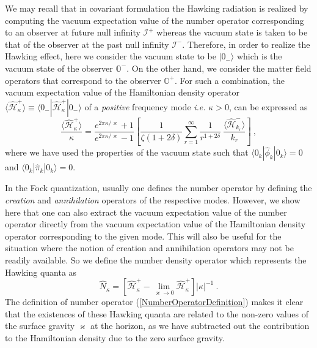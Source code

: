 \documentclass[aps,twocolumn,showpacs]{revtex4}
\def\kr{\kappa}
\def\ksg{\mathrm{\varkappa}}
\def\scriplus{\mathscr{I}^{+}}
\def\scriminus{\mathscr{I}^{-}}
\def\observerminus{\mathbb{O}^{-}}
\def\observerplus{\mathbb{O}^{+}}
\begin{document}
We may recall that in covariant formulation the Hawking radiation is realized 
by computing the vacuum expectation value of the number operator corresponding 
to an observer at future null infinity $\scriplus$ whereas the vacuum state is 
taken to be that of the observer at the past null infinity $\scriminus$. 
Therefore, in order to realize the Hawking effect, here we consider the vacuum 
state to be $|0_{-}\rangle$ which is the vacuum state of the observer 
$\observerminus$. On the other hand, we consider the matter field operators 
that correspond to the observer $\observerplus$. For such a combination, the 
vacuum expectation value of the Hamiltonian density operator $\langle  
\hat{\mathcal{H}}_{\kr}^{+} \rangle \equiv \langle 0_{-}| 
\hat{\mathcal{H}}_{\kr}^{+} |0_{-}\rangle$ of a \emph{positive} frequency mode 
\emph{i.e.} $\kr>0$, can be expressed as
%
\begin{equation}\label{HamiltonianPlusVEV}
\frac{\langle\hat{\mathcal{H}}_{\kr}^{+}\rangle}{\kr} =
\frac{e^{2\pi\kr/\ksg} + 1}{e^{2\pi\kr/\ksg} - 1} 
\left[ \frac{1}{\zeta(1+2\delta)}
\sum_{r=1}^{\infty} \frac{1}{r^{1+2\delta}} ~
\frac{\langle\hat{\mathcal{H}}_{k_r}^{-}\rangle}{k_r}
\right]
~,
\end{equation}
%
where we have used the properties of the vacuum state such that $\langle 
0_k|\hat{\phi}_{k} |0_k\rangle = 0$ and $\langle 0_k|\hat{\pi}_{k} |0_k\rangle = 
0$. 

In the Fock quantization, usually one defines the number operator by defining 
the \emph{creation} and \emph{annihilation} operators of the respective modes.
However, we show here that one can also extract the vacuum expectation 
value of the number operator directly from the vacuum expectation value of the 
Hamiltonian density operator corresponding to the given mode. This will also be 
useful for the situation where the notion of creation and annihilation operators 
may not be readily available. So we define the number density operator which 
represents the Hawking quanta as
%
\begin{equation}\label{NumberOperatorDefinition}
\hat{N}_{\kr} = \left[ 
\hat{\mathcal{H}}_{\kr}^{+} - \lim_{\ksg\to0} \hat{\mathcal{H}}_{\kr}^{+} 
\right] |\kr|^{-1}  ~.
\end{equation}
% 
The definition of number operator (\ref{NumberOperatorDefinition}) makes it 
clear that the existences of these Hawking quanta are related to the non-zero 
values of the surface gravity $\ksg$ at the horizon, as we have subtracted out 
the contribution to the Hamiltonian density due to the zero surface gravity.
\end{document}
